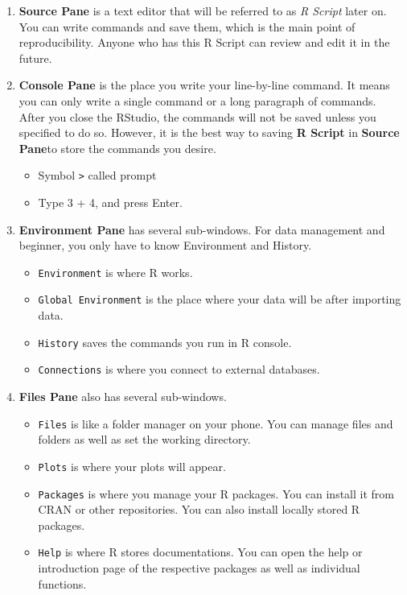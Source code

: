 \documentclass[
]{book}
\providecommand{\tightlist}{%
  \setlength{\itemsep}{0pt}\setlength{\parskip}{0pt}}
\begin{document}
\begin{enumerate}
\def\labelenumi{\arabic{enumi}.}
\item
  \textbf{Source Pane} is a text editor that will be referred to as \emph{R Script} later on. You can write commands and save them, which is the main point of reproducibility. Anyone who has this R Script can review and edit it in the future.
\item
  \textbf{Console Pane} is the place you write your line-by-line command. It means you can only write a single command or a long paragraph of commands. After you close the RStudio, the commands will not be saved unless you specified to do so. However, it is the best way to saving \textbf{R Script} in \textbf{Source Pane}to store the commands you desire.

  \begin{itemize}
  \tightlist
  \item
    Symbol \texttt{\textgreater{}} called prompt
  \item
    Type 3 + 4, and press Enter.
  \end{itemize}
\item
  \textbf{Environment Pane} has several sub-windows. For data management and beginner, you only have to know Environment and History.

  \begin{itemize}
  \tightlist
  \item
    \texttt{Environment} is where R works.
  \item
    \texttt{Global\ Environment} is the place where your data will be after importing data.
  \item
    \texttt{History} saves the commands you run in R console.
  \item
    \texttt{Connections} is where you connect to external databases.
  \end{itemize}
\item
  \textbf{Files Pane} also has several sub-windows.

  \begin{itemize}
  \tightlist
  \item
    \texttt{Files} is like a folder manager on your phone. You can manage files and folders as well as set the working directory.
  \item
    \texttt{Plots} is where your plots will appear.
  \item
    \texttt{Packages} is where you manage your R packages. You can install it from CRAN or other repositories. You can also install locally stored R packages.
  \item
    \texttt{Help} is where R stores documentations. You can open the help or introduction page of the respective packages as well as individual functions.
  \end{itemize}
\end{enumerate}
\end{document}
